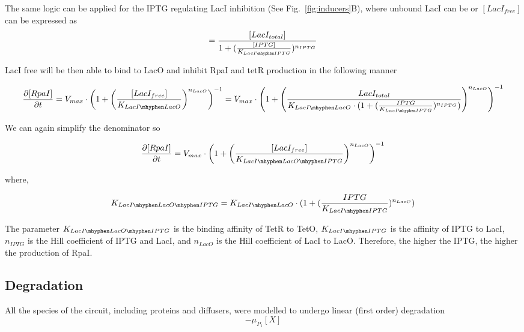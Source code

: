 The same logic can be applied for the IPTG regulating LacI inhibition (See Fig.~\ref{fig:inducers}B), where unbound LacI can be or $[LacI_{free}]$ can be expressed as
\begin{equation}
[LacI{free}] =  \frac{[LacI_{total}]}{1+(\frac{[IPTG]}{K_{LacI \mhyphen IPTG}})^{n_{IPTG}}}
\end{equation}

LacI free will be then able to bind to LacO and inhibit RpaI and tetR production in the following manner

\begin{equation}
    \pdv{[RpaI]}{t} = V_{max}\cdot \left(1+\left(\frac{[LacI_{free}]}{K_{LacI \mhyphen LacO}}\right)^{n_{LacO}}\right)^{-1} = V_{max} \cdot \left(1+\left(\frac{LacI_{total}}{K_{LacI \mhyphen LacO}\cdot(1+(\frac{IPTG}{K_{LacI \mhyphen IPTG}})^{n_{IPTG}})}\right)^{n_{LacO}}\right)^{-1}
\end{equation}


We can again simplify the denominator so

\begin{equation}
    \pdv{[RpaI]}{t} = V_{max}\cdot \left(1+\left(\frac{[LacI_{free}]}{K_{LacI \mhyphen LacO \mhyphen IPTG }}\right)^{n_{LacO}}\right)^{-1}
\end{equation}

where,

\begin{equation}
    K_{LacI \mhyphen LacO \mhyphen IPTG} = K_{LacI \mhyphen LacO}\cdot(1+(\frac{IPTG}{K_{LacI \mhyphen IPTG}})^{n_{LacO}})
\end{equation}

The parameter $K_{LacI \mhyphen LacO \mhyphen IPTG}$ is the binding affinity of TetR to TetO, $K_{LacI \mhyphen IPTG}$ is the affinity of IPTG to LacI, $n_{IPTG}$ is the Hill coefficient of IPTG and LacI, and $n_{LacO}$ is the Hill coefficient of LacI to LacO. Therefore, the higher the IPTG, the higher the production of RpaI.




\subsection{Degradation}
All the species of the circuit, including proteins and diffusers, were modelled to undergo linear (first order) degradation
\begin{equation}
    -\mu_{P_{1}}[X]
    \label{linear degradation}
\end{equation}

